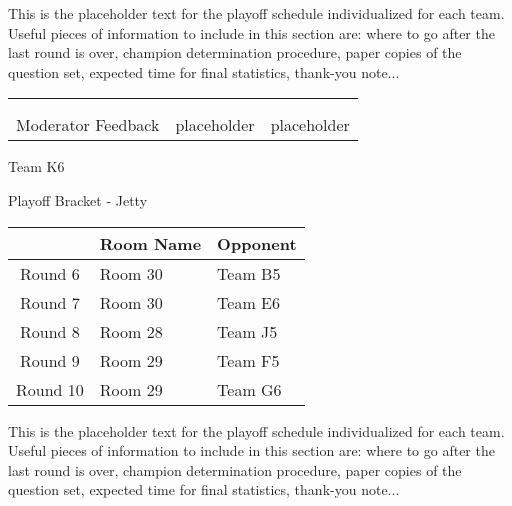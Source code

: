 \documentclass{article}%
\begin{document}
\vspace*{30pt}%
\linebreak%
This is the placeholder text for the playoff schedule individualized for each team. Useful pieces of information to include in this section are: where to go after the last round is over, champion determination procedure, paper copies of the question set, expected time for final statistics, thank{-}you note...%
\vspace*{30pt}%
\newline%
%
\begin{tabularx}{\textwidth}{YYY}%
  &  &  \\%
\\%
Moderator Feedback&placeholder&placeholder\\%
\end{tabularx}%
\newpage%
\begin{center}%
\begin{Huge}%
Team K6%
\end{Huge}%
\vspace*{12pt}%
\linebreak%
\begin{Large}%
Playoff Bracket {-} Jetty%
\end{Large}%
\end{center}%
\vspace*{4pt}%
%
\begin{tabularx}{\textwidth}{|c|Y|Y|}%
\hline%
&Room Name&Opponent\\%
\hline%
Round 6&Room 30&Team B5\\%
Round 7&Room 30&Team E6\\%
Round 8&Room 28&Team J5\\%
Round 9&Room 29&Team F5\\%
Round 10&Room 29&Team G6\\%
\hline%
\end{tabularx}%
\vspace*{30pt}%
\linebreak%
This is the placeholder text for the playoff schedule individualized for each team. Useful pieces of information to include in this section are: where to go after the last round is over, champion determination procedure, paper copies of the question set, expected time for final statistics, thank{-}you note...%
\vspace*{30pt}%
\end{document}

